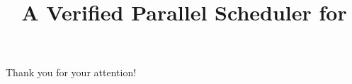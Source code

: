 \documentclass[aspectratio=169, xcolor=dvipsnames]{beamer}
\title{
  A Verified Parallel Scheduler for \OCamlFive
}
\date{
}
\begin{document}

\begin{frame}
\titlepage
\end{frame}











\begin{frame}
\centering
\huge
Thank you for your attention!
\end{frame}



% 

\end{document}
